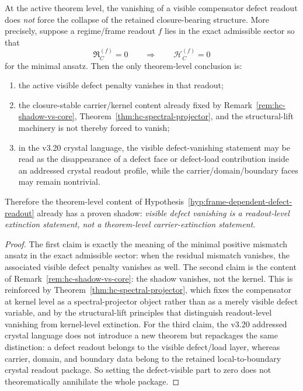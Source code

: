 \begin{theorem}
\label{thm:theorem-level-shadow-frame-dependent-defect-readout}
At the active theorem level, the vanishing of a visible compensator defect readout does \emph{not} force the collapse of the retained closure-bearing structure. More precisely, suppose a regime/frame readout $f$ lies in the exact admissible sector so that
\[
\mathfrak{R}_C^{(f)}=0
\qquad\Longrightarrow\qquad
\mathcal H_C^{(f)}=0
\]
for the minimal ansatz. Then the only theorem-level conclusion is:
\begin{enumerate}[leftmargin=2em,label=(\roman*)]
  \item the active visible defect penalty vanishes in that readout;
  \item the closure-stable carrier/kernel content already fixed by
        Remark~\ref{rem:hc-shadow-vs-core},
        Theorem~\ref{thm:hc-spectral-projector},
        and the structural-lift machinery is not thereby forced to vanish;
  \item in the v3.20 crystal language, the visible defect-vanishing statement may be read as the disappearance of a defect face or defect-load contribution inside an addressed crystal readout profile, while the carrier/domain/boundary faces may remain nontrivial.
\end{enumerate}
Therefore the theorem-level content of Hypothesis~\ref{hyp:frame-dependent-defect-readout} already has a proven shadow: \emph{visible defect vanishing is a readout-level extinction statement, not a theorem-level carrier-extinction statement}.
\end{theorem}

\begin{proof}
The first claim is exactly the meaning of the minimal positive mismatch ansatz in the exact admissible sector: when the residual mismatch vanishes, the associated visible defect penalty vanishes as well. The second claim is the content of Remark~\ref{rem:hc-shadow-vs-core}: the shadow vanishes, not the kernel. This is reinforced by Theorem~\ref{thm:hc-spectral-projector}, which fixes the compensator at kernel level as a spectral-projector object rather than as a merely visible defect variable, and by the structural-lift principles that distinguish readout-level vanishing from kernel-level extinction. For the third claim, the v3.20 addressed crystal language does not introduce a new theorem but repackages the same distinction: a defect readout belongs to the visible defect/load layer, whereas carrier, domain, and boundary data belong to the retained local-to-boundary crystal readout package. So setting the defect-visible part to zero does not theorematically annihilate the whole package.
\end{proof}

